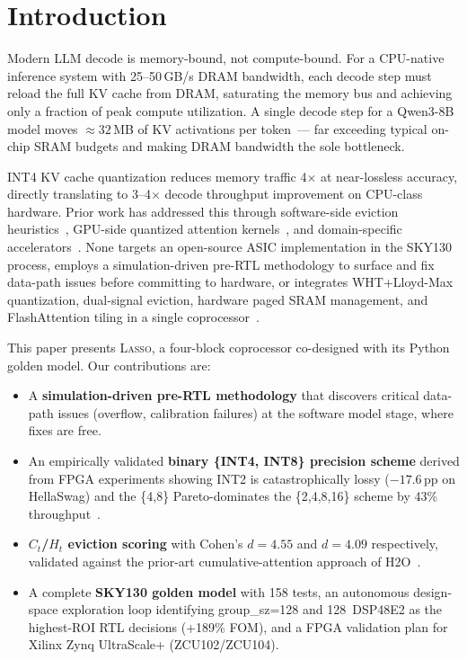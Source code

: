 \documentclass[conference]{IEEEtran}
\newcommand{\lasso}{\textsc{Lasso}}
\begin{document}
\section{Introduction}
\label{sec:intro}

Modern LLM decode is memory-bound, not compute-bound. For a
CPU-native inference system with 25--50\,GB/s DRAM bandwidth, each
decode step must reload the full KV cache from DRAM, saturating the
memory bus and achieving only a fraction of peak compute utilization.
A single decode step for a Qwen3-8B model moves ${\approx}32$\,MB of
KV activations per token~--- far exceeding typical on-chip SRAM
budgets and making DRAM bandwidth the sole bottleneck.

INT4 KV cache quantization reduces memory traffic 4$\times$ at
near-lossless accuracy, directly translating to 3--4$\times$ decode
throughput improvement on CPU-class hardware. Prior work has addressed
this through software-side eviction heuristics~\cite{h2o2023,
snapkv2024, streamingllm2023}, GPU-side quantized attention
kernels~\cite{sageattention2024, intflashattention2024}, and
domain-specific accelerators~\cite{titanus2025, kelle2025}. None
targets an open-source ASIC implementation in the SKY130 process, employs
a simulation-driven pre-RTL methodology to surface and fix data-path
issues before committing to hardware, or integrates WHT+Lloyd-Max
quantization, dual-signal eviction, hardware paged SRAM management,
and FlashAttention tiling in a single coprocessor~\cite{oaken2025}.

This paper presents \lasso, a four-block coprocessor co-designed with
its Python golden model. Our contributions are:
\begin{itemize}
  \item A \textbf{simulation-driven pre-RTL methodology} that discovers
        critical data-path issues (overflow, calibration failures) at
        the software model stage, where fixes are free.
  \item An empirically validated \textbf{binary \{INT4, INT8\}
        precision scheme} derived from FPGA experiments showing INT2
        is catastrophically lossy ($-17.6$\,pp on HellaSwag) and the
        \{4,8\} Pareto-dominates the \{2,4,8,16\} scheme by 43\%
        throughput~\cite{dwb2026}.
  \item \textbf{$C_t$/$H_t$ eviction scoring} with Cohen's
        $d{=}4.55$ and $d{=}4.09$ respectively, validated against the
        prior-art cumulative-attention approach of H2O~\cite{h2o2023}.
  \item A complete \textbf{SKY130 golden model} with 158 tests, an
        autonomous design-space exploration loop identifying group\_sz=128
        and 128~DSP48E2 as the highest-ROI RTL decisions (+189\% FOM),
        and a FPGA validation plan for Xilinx Zynq UltraScale+ (ZCU102/ZCU104).
\end{itemize}
\end{document}
